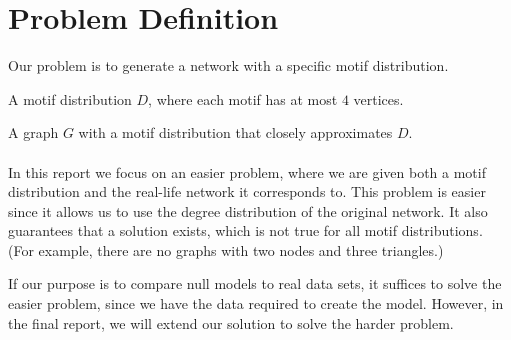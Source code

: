 \section{Problem Definition}
\label{sec:problem}
Our problem is to generate a network with a specific motif distribution.

 A motif distribution $D$, where each motif has at most $4$ vertices.

 A graph $G$ with a motif distribution that closely approximates $D$.
\\\\
In this report we focus on an easier problem, where we are given both a motif distribution and the real-life network it corresponds to.  This problem is easier since it allows us to use the degree distribution of the original network.  It also guarantees that a solution exists, which is not true for all motif distributions.  (For example, there are no graphs with two nodes and three triangles.)

If our purpose is to compare null models to real data sets, it suffices to solve the easier problem, since we have the data required to create the model.  However, in the final report, we will extend our solution to solve the harder problem.

